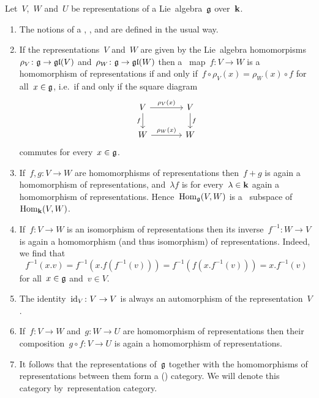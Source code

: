 \begin{remark}
  Let~$V$,~$W$ and~$U$ be representations of a Lie~algebra~$\mathfrak{g}$ over~$\kf$.
  \begin{enumerate}
    \item
      The notions of a , ,  and  are defined in the usual way.
    \item
      If the representations~$V$ and~$W$ are given by the Lie~algebra homomorpisms~$\rho_V \colon \mathfrak{g} \to \mathfrak{gl}(V)$ and~$\rho_W \colon \mathfrak{g} \to \mathfrak{gl}(W)$ then a~{\linear{$\kf$}} map~$f \colon V \to W$ is a homomorphism of representations if and only if~$f \circ \rho_V(x) = \rho_W(x) \circ f$ for all~$x \in \mathfrak{g}$, i.e.\ if and only if the square diagram
      \[
        \begin{tikzcd}[column sep = large]
          V
          \arrow{r}[above]{\rho_V(x)}
          \arrow{d}[left]{f}
          &
          V
          \arrow{d}[right]{f}
          \\
          W
          \arrow{r}[above]{\rho_W(x)}
          &
          W
        \end{tikzcd}
      \]
      commutes for every~$x \in \mathfrak{g}$.
    \item
      If~$f, g \colon V \to W$ are homomorphisms of representations then~$f + g$ is again a homomorphism of representations, and~$\lambda f$ is for every~$\lambda \in \mathbf{k}$ again a homomorphism of representations.
      Hence~$\operatorname{Hom}_{\mathfrak{g}}(V,W)$ is a~{\linear{$\kf$}} subspace of~$\operatorname{Hom}_{\mathbf{k}}(V,W)$.
    \item
      If~$f \colon V \to W$ is an isomorphism of representations then its inverse~$f^{-1} \colon W \to V$ is again a homomorphism (and thus isomorphism) of representations.
      Indeed, we find that
      \[
        f^{-1}(x.v)
        =
        f^{-1}(x.f(f^{-1}(v)))
        =
        f^{-1}(f(x.f^{-1}(v)))
        =
        x.f^{-1}(v)
      \]
      for all~$x \in \mathfrak{g}$ and~$v \in V$.
    \item
      The identity~$\operatorname{id}_V \colon V \to V$ is always an automorphism of the representation~$V$.
    \item
      If~$f \colon V \to W$ and~$g \colon W \to U$ are homomorphism of representations then their composition~$g \circ f \colon V \to U$ is again a homomorphism of representations.
    \item
      It follows that the representations of~$\mathfrak{g}$ together with the homomorphisms of representations between them form a (\linear{$\kf$}) category.
      We will denote this category by~\gls*{representation category}.
  \end{enumerate}
\end{remark}


